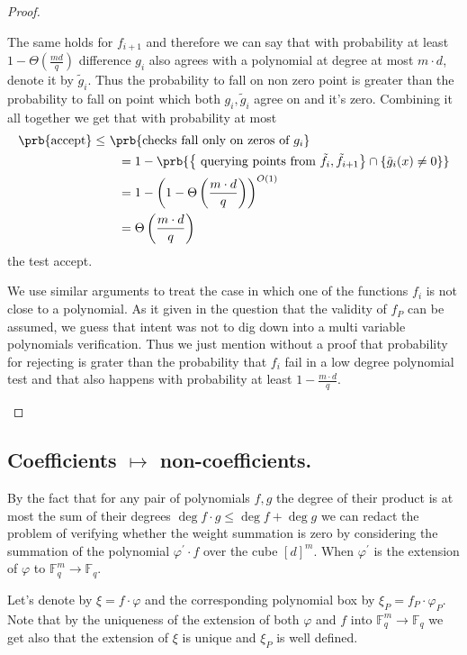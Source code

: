 \documentclass{article}
\newcommand{\FF}{\mathbb{F}_{q}}
\begin{document}
\begin{proof}
\begin{enumerate}
      The same holds for $f_{i+1}$ and therefore we can say that with probability at least $1 - \Theta(\frac{md}{q})$ difference $g_{i}$ also agrees with a polynomial at degree at most $m\cdot d$, denote it by $\tilde{g}_{i}$. Thus the probability to fall on non zero point is greater than the probability to fall on point which both $g_{i},\tilde{g}_{i}$ agree on and it's zero. Combining it all together we get that with probability at most 
      \begin{equation*}
        \begin{split}
          \prb{\text{accept}} \le \  & \prb{\text{checks fall only on zeros of } g_{i}} \\
          & \ \ =  1 - \prb{ \left\{ \text{ querying points from } \tilde{f}_{i}, \tilde{f}_{i+1}  \right\} \cap \left\{  \tilde{g}_i(x) \neq 0 \right\} } \\
          & \ \ =  1 - \left( 1 - \Theta\left(\frac{m\cdot d}{q} \right) \right)^{O(1)} \\ 
          & \ \ = \Theta\left(\frac{m\cdot d}{q} \right)
        \end{split}
      \end{equation*}
    the test accept.


      We use similar arguments to treat the case in which one of the functions $f_{i}$ is not close to a polynomial. As it given in the question that the validity of $f_{P}$ can be assumed, we guess that intent was not to dig down into a multi variable polynomials verification. Thus we just mention without a proof that probability for rejecting is grater than the probability that $f_{i}$ fail in a low degree polynomial test and that also happens with probability at least $1 - \frac{m\cdot d}{q}$. 
  \end{enumerate}
\end{proof}

\subsection{ Coefficients $\mapsto$ non-coefficients. }
By the fact that for any pair of polynomials $f,g$ the degree of their product is at most the sum of their degrees  $\deg f \cdot g \le \deg f + \deg g$  we can redact the problem of verifying whether the weight summation is zero by considering the summation of the polynomial $\varphi^{\prime} \cdot f$ over the cube $[d]^{m}$. When $\varphi^{\prime}$ is the extension of $\varphi$  to $\FF^{m} \rightarrow \FF$. 

Let's denote by $\xi = f\cdot\varphi$ and the corresponding polynomial box by $\xi_{P} = f_{P} \cdot \varphi_{P}$. Note that by the uniqueness of the extension of both $\varphi$ and $f$ into $\FF^{m}\rightarrow \FF$ we get also that the extension of $\xi$ is unique and $\xi_{P}$ is well defined.  
\end{document}
